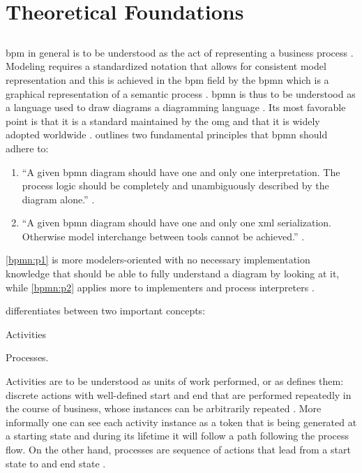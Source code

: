 \chapter{Theoretical Foundations}

\section{}
\label{sec:wfms}

\gls{bpm} in general is to be understood as the act of representing a business process \citep{Silver2011}. Modeling requires a standardized notation that allows for consistent model representation and this is achieved in the \gls{bpm} field by the \gls{bpmn} which is a graphical representation of a semantic process \citep{Silver2011}. \gls{bpmn} is thus to be understood as a language used to draw diagrams \ie a diagramming language \citep{Silver2011}. Its most favorable point is that it is a standard maintained by the \gls{omg} and that it is widely adopted worldwide \citep{Silver2011}. \citet{Silver2011} outlines two fundamental principles that \gls{bpmn} should adhere to:

\begin{enumerate}[label=\textbf{P. \Roman*},ref=Principle \Roman*]
 	\item ``A given \gls{bpmn} diagram should have one and only one interpretation. The process logic should be completely and unambiguously described by the diagram alone.'' \citep[p. v]{Silver2011}. \label{bpmn:p1}
 	\item ``A given \gls{bpmn} diagram should have one and only one \gls{xml} serialization. Otherwise model interchange between tools cannot be achieved.'' \citep[p. v]{Silver2011}. \label{bpmn:p2}
\end{enumerate} 

\ref{bpmn:p1} is more modelers-oriented with no necessary implementation knowledge that should be able to fully understand a diagram by looking at it, while \ref{bpmn:p2} applies more to implementers and process interpreters \citep{Silver2011}.

\citet{Silver2011} differentiates between two important concepts:
\begin{enumerate*}
	\item Activities
	\item Processes.
\end{enumerate*}

Activities are to be understood as units of work performed, or as \citet{Silver2011} defines them: discrete actions with well-defined start and end that are performed repeatedly in the course of business, whose instances can be arbitrarily repeated \citep[p. 10]{Silver2011}. More informally one can see each activity instance as a token that is being generated at a starting state and during its lifetime it will follow a path following the process flow. On the other hand, processes are sequence of actions that lead from a start state to and end state \citep[p. 11]{Silver2011}.

